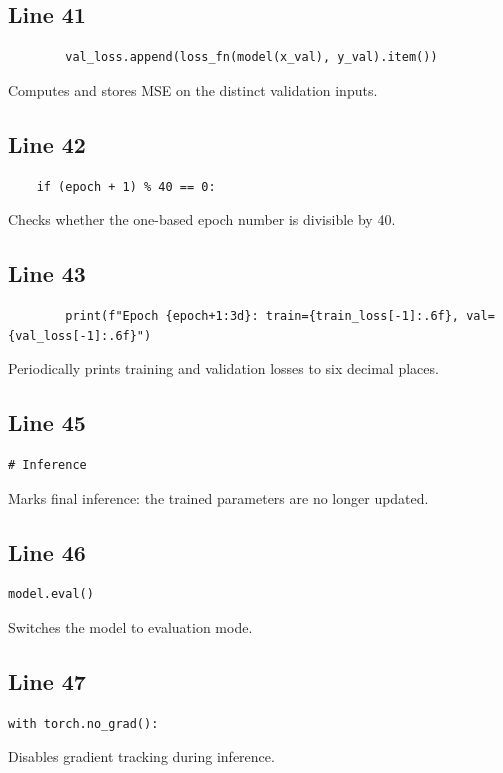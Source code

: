 \documentclass[11pt,a4paper]{article}
\begin{document}
\subsection*{Line 41}
\begin{lstlisting}
        val_loss.append(loss_fn(model(x_val), y_val).item())
\end{lstlisting}
Computes and stores MSE on the distinct validation inputs.

\subsection*{Line 42}
\begin{lstlisting}
    if (epoch + 1) % 40 == 0:
\end{lstlisting}
Checks whether the one-based epoch number is divisible by 40.

\subsection*{Line 43}
\begin{lstlisting}
        print(f"Epoch {epoch+1:3d}: train={train_loss[-1]:.6f}, val={val_loss[-1]:.6f}")
\end{lstlisting}
Periodically prints training and validation losses to six decimal places.

\subsection*{Line 45}
\begin{lstlisting}
# Inference
\end{lstlisting}
Marks final inference: the trained parameters are no longer updated.

\subsection*{Line 46}
\begin{lstlisting}
model.eval()
\end{lstlisting}
Switches the model to evaluation mode.

\subsection*{Line 47}
\begin{lstlisting}
with torch.no_grad():
\end{lstlisting}
Disables gradient tracking during inference.
\end{document}

